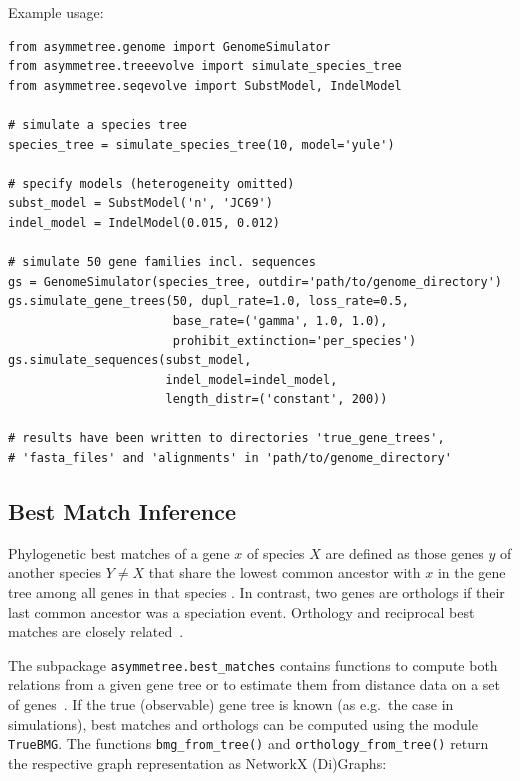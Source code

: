 \documentclass[hidelinks,11pt]{article}
\begin{document}
Example usage:

\begin{adjustwidth}{1cm}{1cm}\vspace{2mm}
\begin{verbatim}
from asymmetree.genome import GenomeSimulator
from asymmetree.treeevolve import simulate_species_tree
from asymmetree.seqevolve import SubstModel, IndelModel

# simulate a species tree
species_tree = simulate_species_tree(10, model='yule')

# specify models (heterogeneity omitted)
subst_model = SubstModel('n', 'JC69')
indel_model = IndelModel(0.015, 0.012)

# simulate 50 gene families incl. sequences
gs = GenomeSimulator(species_tree, outdir='path/to/genome_directory')
gs.simulate_gene_trees(50, dupl_rate=1.0, loss_rate=0.5,
                       base_rate=('gamma', 1.0, 1.0),
                       prohibit_extinction='per_species')
gs.simulate_sequences(subst_model,
                      indel_model=indel_model,
                      length_distr=('constant', 200))

# results have been written to directories 'true_gene_trees',
# 'fasta_files' and 'alignments' in 'path/to/genome_directory'
\end{verbatim}
\end{adjustwidth}



\subsection{Best Match Inference}

Phylogenetic best matches of a gene $x$ of species $X$ are defined as those genes $y$ of another species $Y\ne X$ that share the lowest common ancestor with $x$ in the gene tree among all genes in that species \citep{geiss2019a,geiss2020b,geiss2020c}.
In contrast, two genes are orthologs if their last common ancestor was a speciation event.
Orthology and reciprocal best matches are closely related~\citep{geiss2020c}.

The subpackage \texttt{asymmetree.best\_matches} contains functions to compute both relations from a given gene tree or to estimate them from distance data on a set of genes~\citep{stadler2020}.
If the true (observable) gene tree is known (as e.g.\ the case in simulations), best matches and orthologs can be computed using the module \texttt{TrueBMG}.
The functions \texttt{bmg\_from\_tree()} and \texttt{orthology\_from\_tree()} return the respective graph representation as NetworkX (Di)Graphs:
\end{document}
